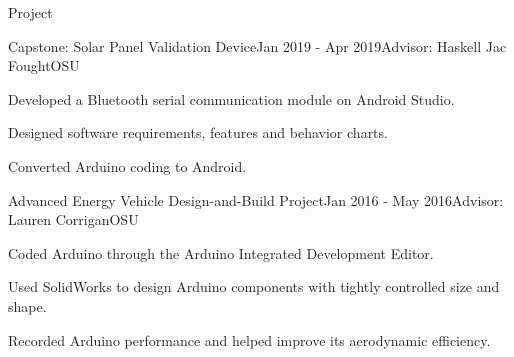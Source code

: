 \documentclass{resume} %
\begin{document}
\begin{rSection}{Project}
    \begin{rSubsection}{Capstone: Solar Panel Validation Device}{Jan 2019 - Apr 2019}{Advisor: Haskell Jac Fought}{OSU}
        \item Developed a Bluetooth serial communication module on Android Studio.
        \item Designed software requirements, features and behavior charts.
        \item Converted Arduino coding to Android.
    \end{rSubsection}

    \begin{rSubsection}{Advanced Energy Vehicle Design-and-Build Project}{Jan 2016 - May 2016}{Advisor: Lauren Corrigan}{OSU}
        \item Coded Arduino through the Arduino Integrated Development Editor.
        \item Used SolidWorks to design Arduino components with tightly controlled size and shape.
        \item Recorded Arduino performance and helped improve its aerodynamic efficiency.
    \end{rSubsection}

\end{rSection}

\end{document}
